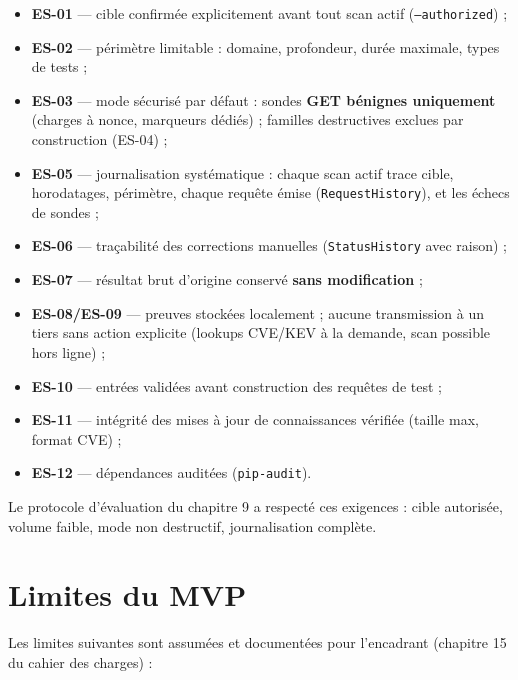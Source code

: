 \documentclass[11pt,a4paper]{report}
\newcommand{\code}[1]{\texttt{#1}}
\begin{document}
\begin{itemize}[leftmargin=1.5em]
  \item \textbf{ES-01} --- cible confirmée explicitement avant tout scan actif
        (\code{--authorized}) ;
  \item \textbf{ES-02} --- périmètre limitable : domaine, profondeur, durée maximale,
        types de tests ;
  \item \textbf{ES-03} --- mode sécurisé par défaut : sondes \textbf{GET bénignes
        uniquement} (charges à nonce, marqueurs dédiés) ; familles destructives exclues
        par construction (ES-04) ;
  \item \textbf{ES-05} --- journalisation systématique : chaque scan actif trace cible,
        horodatages, périmètre, chaque requête émise (\code{RequestHistory}), et les
        échecs de sondes ;
  \item \textbf{ES-06} --- traçabilité des corrections manuelles (\code{StatusHistory}
        avec raison) ;
  \item \textbf{ES-07} --- résultat brut d'origine conservé \textbf{sans modification} ;
  \item \textbf{ES-08/ES-09} --- preuves stockées localement ; aucune transmission à un
        tiers sans action explicite (lookups CVE/KEV à la demande, scan possible hors
        ligne) ;
  \item \textbf{ES-10} --- entrées validées avant construction des requêtes de test ;
  \item \textbf{ES-11} --- intégrité des mises à jour de connaissances vérifiée (taille
        max, format CVE) ;
  \item \textbf{ES-12} --- dépendances auditées (\code{pip-audit}).
\end{itemize}

Le protocole d'évaluation du chapitre 9 a respecté ces exigences : cible autorisée, volume
faible, mode non destructif, journalisation complète.

\chapter{Limites du MVP}

Les limites suivantes sont assumées et documentées pour l'encadrant (chapitre 15 du cahier
des charges) :
\end{document}
